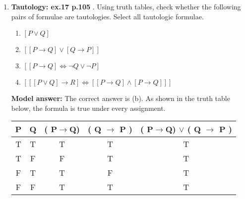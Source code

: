 \documentclass[a4,11pt]{article}
\newcommand{\6}{\mbox{$[\hspace*{-.6mm}[$}}
\newcommand{\9}{\mbox{$]\hspace*{-.6mm}]$}}
\begin{document}
\begin{enumerate}[leftmargin = 12pt]
\begin{enumerate}
\item The argument is valid, because when the conclusion is true in every case that the premises are true.
\item The argument is not valid, because it is not the case that the conclusion is true in every case that the premises are true.
\end{enumerate}

{ \bf Model answer:}  The correct answer is (b), the argument is not valid. It is not valid because there is one case in which the premises are true (R is true and P $\to$ R is true) but the conclusion is false.

\item {\bf Tautology: ex.17 p.105} . Using truth tables, check whether the following pairs of formulae are tautologies. Select all tautologic formulae.

\begin{enumerate}
\item $[P \lor Q]$
\item $[[P\rightarrow Q]  \lor  [Q \rightarrow P]]$
\item $[[P \rightarrow Q] \iff \neg Q \lor \neg P ]$ 
\item $[[[P \lor Q] \rightarrow  R] \iff [[P \rightarrow Q] \land [P \rightarrow  Q]]]$
\end{enumerate}


{ \bf Model answer:} The correct answer is (b). As shown in the truth table below, the formula is true under every assignment.

\begin{tabular}{c | c | c | c | c}
\hline \hline
P & Q &  ( P$\rightarrow$Q) & ( Q $\rightarrow$ P )  & ( P$\rightarrow$Q) $\lor$ ( Q $\rightarrow$ P ) \\
\hline
T & T & T& T & T\\
T & F & F& T & T\\
F & T & T & F& T\\
F & F & T& T& T \\
\hline \hline
\end{tabular}

\end{enumerate}
\end{document}
